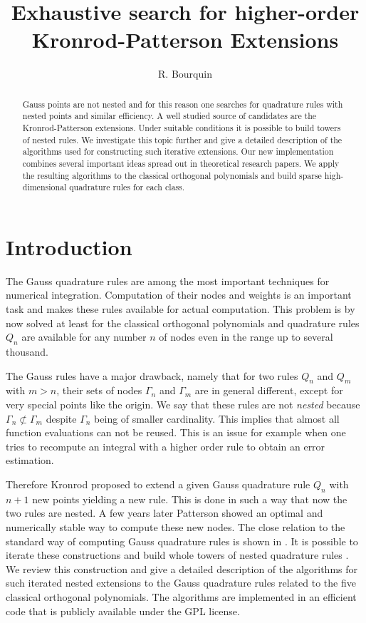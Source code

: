 \documentclass[a4paper,10pt]{article}
\title{Exhaustive search for higher-order Kronrod-Patterson Extensions}
\author{R. Bourquin}
\begin{document}
\maketitle

\begin{abstract}
  Gauss points are not nested and for this reason one searches
  for quadrature rules with nested points and similar efficiency.
  A well studied source of candidates are the Kronrod-Patterson
  extensions. Under suitable conditions it is possible to build
  towers of nested rules. We investigate this topic further and
  give a detailed description of the algorithms used for constructing
  such iterative extensions. Our new implementation combines several
  important ideas spread out in theoretical research papers. We
  apply the resulting algorithms to the classical orthogonal polynomials
  and build sparse high-dimensional quadrature rules for each class.
\end{abstract}


\section{Introduction}

The Gauss quadrature rules are among the most important techniques
for numerical integration. Computation of their nodes and weights
is an important task and makes these rules available for actual computation.
This problem is by now solved at least for the classical orthogonal
polynomials and quadrature rules $Q_n$ are available for any number $n$
of nodes even in the range up to several thousand.

The Gauss rules have a major drawback, namely that for two
rules $Q_n$ and $Q_m$ with $m > n$, their sets of nodes $\Gamma_n$
and $\Gamma_m$ are in general different, except for very special
points like the origin.
We say that these rules are not \emph{nested} because
$\Gamma_n \not\subset \Gamma_m$ despite $\Gamma_n$ being of smaller
cardinality. This implies that almost all function evaluations can
not be reused. This is an issue for example when one tries to recompute
an integral with a higher order rule to obtain an error estimation.

Therefore Kronrod proposed \cite{kronrod} to extend a given Gauss
quadrature rule $Q_n$ with $n+1$ new points yielding a new rule.
This is done in such a way that now the two rules are nested. A few
years later Patterson showed \cite{patterson1968} an optimal and
numerically stable way to compute these new nodes. The close relation to
the standard way of computing Gauss quadrature rules is shown in \cite{laurie}.
It is possible to iterate these constructions and build whole
towers of nested quadrature rules \cite{mehrotra-papp}. We review
this construction and give a detailed description of the algorithms for
such iterated nested extensions to the Gauss quadrature rules related
to the five classical orthogonal polynomials. The algorithms are implemented
in an efficient code that is publicly available under the GPL license.
\end{document}
